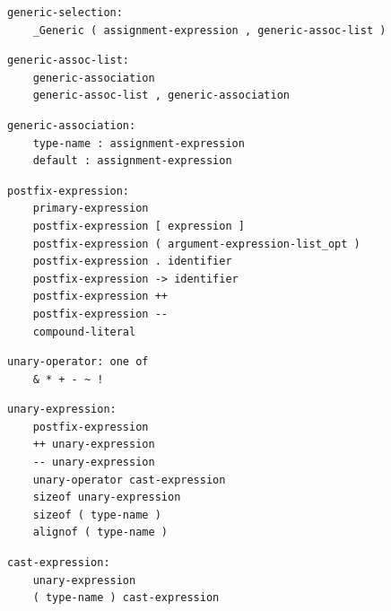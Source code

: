 \noindent\textbf{\texttt{}}\par
\begin{lstlisting}
generic-selection:
    _Generic ( assignment-expression , generic-assoc-list )
\end{lstlisting}

\noindent\textbf{\texttt{}}\par
\begin{lstlisting}
generic-assoc-list:
    generic-association
    generic-assoc-list , generic-association
\end{lstlisting}

\noindent\textbf{\texttt{}}\par
\begin{lstlisting}
generic-association:
    type-name : assignment-expression
    default : assignment-expression
\end{lstlisting}

\noindent\textbf{\texttt{}}\par
\begin{lstlisting}
postfix-expression:
    primary-expression
    postfix-expression [ expression ]
    postfix-expression ( argument-expression-list_opt )
    postfix-expression . identifier
    postfix-expression -> identifier
    postfix-expression ++
    postfix-expression --
    compound-literal
\end{lstlisting}

\noindent\textbf{\texttt{}}\par
\begin{lstlisting}
unary-operator: one of
    & * + - ~ !
\end{lstlisting}

\noindent\textbf{\texttt{}}\par
\begin{lstlisting}
unary-expression:
    postfix-expression
    ++ unary-expression
    -- unary-expression
    unary-operator cast-expression
    sizeof unary-expression
    sizeof ( type-name )
    alignof ( type-name )
\end{lstlisting}

\noindent\textbf{\texttt{}}\par
\begin{lstlisting}
cast-expression:
    unary-expression
    ( type-name ) cast-expression
\end{lstlisting}

